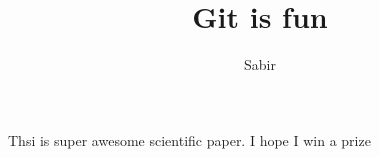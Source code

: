 \documentclass[10pt]{article}
\author{Sabir}
\title{Git is fun}
\begin{document}
       \maketitle

       Thsi is super awesome scientific paper.
       I hope I win a prize
\end{document}
